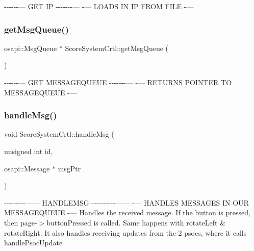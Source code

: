 -\/-\/-\/-\/-\/-\/--- G\+ET IP -\/-\/-\/-\/-\/-\/-\/--- -\/--- L\+O\+A\+DS IN IP F\+R\+OM F\+I\+LE -\/--- \mbox{\label{class_score_system_crtl_a5dc4b60ddc680b5a8c8e6ab646e7d049}} 
\subsubsection{\texorpdfstring{get\+Msg\+Queue()}{getMsgQueue()}}
{\footnotesize\ttfamily osapi\+::\+Msg\+Queue $\ast$ Score\+System\+Crtl\+::get\+Msg\+Queue (\begin{DoxyParamCaption}{ }\end{DoxyParamCaption})}

-\/-\/-\/-\/-\/-\/--- G\+ET M\+E\+S\+S\+A\+G\+E\+Q\+U\+E\+UE -\/-\/-\/-\/-\/-\/-\/--- -\/--- R\+E\+T\+U\+R\+NS P\+O\+I\+N\+T\+ER TO M\+E\+S\+S\+A\+G\+E\+Q\+U\+E\+UE -\/--- \mbox{\label{class_score_system_crtl_a5c168a573054312aedf6c7da099f7ba4}} 
\subsubsection{\texorpdfstring{handle\+Msg()}{handleMsg()}}
{\footnotesize\ttfamily void Score\+System\+Crtl\+::handle\+Msg (\begin{DoxyParamCaption}\item[{unsigned int}]{id,  }\item[{osapi\+::\+Message $\ast$}]{msg\+Ptr }\end{DoxyParamCaption})\hspace{0.3cm}{\ttfamily [private]}}

-\/-\/-\/-\/-\/-\/-\/-\/-\/------ H\+A\+N\+D\+L\+E\+M\+SG -\/-\/-\/-\/-\/-\/-\/-\/-\/-\/------ -\/--- H\+A\+N\+D\+L\+ES M\+E\+S\+S\+A\+G\+ES IN O\+UR M\+E\+S\+S\+A\+G\+E\+Q\+U\+E\+UE -\/--- Handles the received message. If the button is pressed, then page-\/$>$button\+Pressed is called. Same happens with rotate\+Left \& rotate\+Right. It also handles receiving updates from the 2 psocs, where it calls handle\+Psoc\+Update\mbox{\label{class_score_system_crtl_a5644cff9cfc9fbe9ca962823be333cf0}} 

